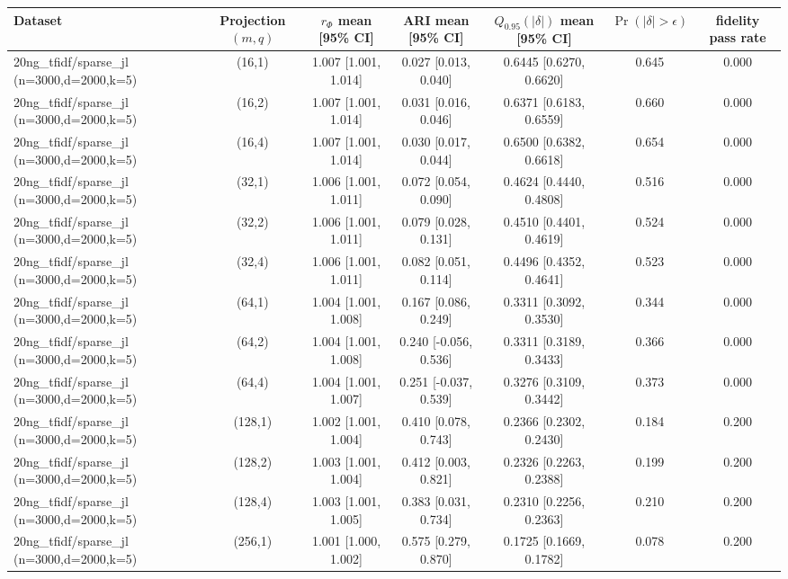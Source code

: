 \begin{tabular}{lcccccc}
\toprule
Dataset & Projection $(m,q)$ & $r_\Phi$ mean [95\% CI] & ARI mean [95\% CI] & $Q_{0.95}(|\delta|)$ mean [95\% CI] & $\Pr(|\delta|>\epsilon)$ & fidelity pass rate \\
\midrule
20ng\_tfidf/sparse\_jl (n=3000,d=2000,k=5) & (16,1) & 1.007 [1.001, 1.014] & 0.027 [0.013, 0.040] & 0.6445 [0.6270, 0.6620] & 0.645 & 0.000 \\
20ng\_tfidf/sparse\_jl (n=3000,d=2000,k=5) & (16,2) & 1.007 [1.001, 1.014] & 0.031 [0.016, 0.046] & 0.6371 [0.6183, 0.6559] & 0.660 & 0.000 \\
20ng\_tfidf/sparse\_jl (n=3000,d=2000,k=5) & (16,4) & 1.007 [1.001, 1.014] & 0.030 [0.017, 0.044] & 0.6500 [0.6382, 0.6618] & 0.654 & 0.000 \\
20ng\_tfidf/sparse\_jl (n=3000,d=2000,k=5) & (32,1) & 1.006 [1.001, 1.011] & 0.072 [0.054, 0.090] & 0.4624 [0.4440, 0.4808] & 0.516 & 0.000 \\
20ng\_tfidf/sparse\_jl (n=3000,d=2000,k=5) & (32,2) & 1.006 [1.001, 1.011] & 0.079 [0.028, 0.131] & 0.4510 [0.4401, 0.4619] & 0.524 & 0.000 \\
20ng\_tfidf/sparse\_jl (n=3000,d=2000,k=5) & (32,4) & 1.006 [1.001, 1.011] & 0.082 [0.051, 0.114] & 0.4496 [0.4352, 0.4641] & 0.523 & 0.000 \\
20ng\_tfidf/sparse\_jl (n=3000,d=2000,k=5) & (64,1) & 1.004 [1.001, 1.008] & 0.167 [0.086, 0.249] & 0.3311 [0.3092, 0.3530] & 0.344 & 0.000 \\
20ng\_tfidf/sparse\_jl (n=3000,d=2000,k=5) & (64,2) & 1.004 [1.001, 1.008] & 0.240 [-0.056, 0.536] & 0.3311 [0.3189, 0.3433] & 0.366 & 0.000 \\
20ng\_tfidf/sparse\_jl (n=3000,d=2000,k=5) & (64,4) & 1.004 [1.001, 1.007] & 0.251 [-0.037, 0.539] & 0.3276 [0.3109, 0.3442] & 0.373 & 0.000 \\
20ng\_tfidf/sparse\_jl (n=3000,d=2000,k=5) & (128,1) & 1.002 [1.001, 1.004] & 0.410 [0.078, 0.743] & 0.2366 [0.2302, 0.2430] & 0.184 & 0.200 \\
20ng\_tfidf/sparse\_jl (n=3000,d=2000,k=5) & (128,2) & 1.003 [1.001, 1.004] & 0.412 [0.003, 0.821] & 0.2326 [0.2263, 0.2388] & 0.199 & 0.200 \\
20ng\_tfidf/sparse\_jl (n=3000,d=2000,k=5) & (128,4) & 1.003 [1.001, 1.005] & 0.383 [0.031, 0.734] & 0.2310 [0.2256, 0.2363] & 0.210 & 0.200 \\
20ng\_tfidf/sparse\_jl (n=3000,d=2000,k=5) & (256,1) & 1.001 [1.000, 1.002] & 0.575 [0.279, 0.870] & 0.1725 [0.1669, 0.1782] & 0.078 & 0.200 \\

\end{tabular}
